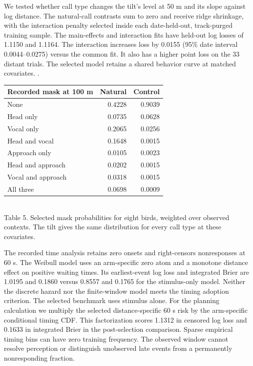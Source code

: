 {We tested whether call type changes the tilt's level at 50 m and its slope against log distance. The natural-call contrasts sum to zero and receive ridge shrinkage, with the interaction penalty selected inside each date-held-out, track-purged training sample. The main-effects and interaction fits have held-out log losses of 1.1150 and 1.1164. The interaction increases loss by 0.0155 (95\% date interval 0.0044--0.0275) versus the common fit. It also has a higher point loss on the 33 distant trials. The selected model retains a shared behavior curve at matched covariates. .
\begin{center}\small
\begin{tabular}{lrr}
\toprule
Recorded mask at 100 m & Natural & Control\\
\midrule
None & 0.4228 & 0.9039\\
Head only & 0.0735 & 0.0628\\
Vocal only & 0.2065 & 0.0256\\
Head and vocal & 0.1648 & 0.0015\\
Approach only & 0.0105 & 0.0023\\
Head and approach & 0.0202 & 0.0015\\
Vocal and approach & 0.0318 & 0.0015\\
All three & 0.0698 & 0.0009\\
\bottomrule
\end{tabular}\\[3pt]
Table 5. Selected mask probabilities for eight birds, weighted over observed contexts. The tilt gives the same distribution for every call type at these covariates.
\end{center}


The recorded time analysis retains zero onsets and right-censors nonresponses at 60 s. The Weibull model uses an arm-specific zero atom and a monotone distance effect on positive waiting times. Its earliest-event log loss and integrated Brier are 1.0195 and 0.1860 versus 0.8557 and 0.1765 for the stimulus-only model. Neither the discrete hazard nor the finite-window model meets the timing adoption criterion. The selected benchmark uses stimulus alone. For the planning calculation we multiply the selected distance-specific 60 s risk by the arm-specific conditional timing CDF. This factorization scores 1.1312 in censored log loss and 0.1633 in integrated Brier in the post-selection comparison. Sparse empirical timing bins can have zero training frequency. The observed window cannot resolve perception or distinguish unobserved late events from a permanently nonresponding fraction.


}
